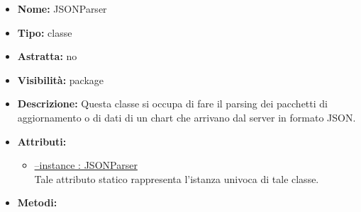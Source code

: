 			
			\begin{itemize}
			\item \textbf{Nome:} JSONParser
			\item \textbf{Tipo:} classe
			
		\item \textbf{Astratta:}
		no
			\item \textbf{Visibilità:} package
			\item \textbf{Descrizione:} Questa classe si occupa di fare il parsing dei pacchetti di aggiornamento o di dati di un chart che arrivano dal server in formato JSON.
			\item \textbf{Attributi:}
				\begin{itemize}
				\setlength{\itemsep}{5pt}
				
					\item[\ding{111}] \underline{--instance : JSONParser} \\ [1mm] Tale attributo statico rappresenta l'istanza univoca di tale classe.
				\end{itemize}
		
			\item \textbf{Metodi:}
				\begin{itemize}
				\setlength{\itemsep}{5pt}
				

\end{itemize}
\end{itemize}
